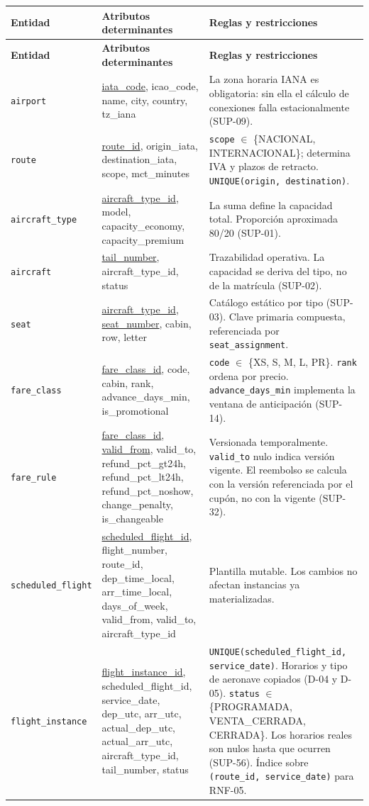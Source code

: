 \documentclass[10pt,letterpaper]{article}
\begin{document}
\begin{longtable}{@{}L{3.0cm} L{6.6cm} L{6.2cm}@{}}
\toprule \textbf{Entidad} & \textbf{Atributos determinantes} & \textbf{Reglas y restricciones} \\ \midrule \endfirsthead
\toprule \textbf{Entidad} & \textbf{Atributos determinantes} & \textbf{Reglas y restricciones} \\ \midrule \endhead
\texttt{airport} & \underline{iata\_code}, icao\_code, name, city, country, tz\_iana & La zona horaria IANA es obligatoria: sin ella el cálculo de conexiones falla estacionalmente (SUP-09). \\
\texttt{route} & \underline{route\_id}, origin\_iata, destination\_iata, scope, mct\_minutes & \texttt{scope} $\in$ \{NACIONAL, INTERNACIONAL\}; determina IVA y plazos de retracto. \texttt{UNIQUE(origin, destination)}. \\
\texttt{aircraft\_type} & \underline{aircraft\_type\_id}, model, capacity\_economy, capacity\_premium & La suma define la capacidad total. Proporción aproximada 80/20 (SUP-01). \\
\texttt{aircraft} & \underline{tail\_number}, aircraft\_type\_id, status & Trazabilidad operativa. La capacidad se deriva del tipo, no de la matrícula (SUP-02). \\
\texttt{seat} & \underline{aircraft\_type\_id}, \underline{seat\_number}, cabin, row, letter & Catálogo estático por tipo (SUP-03). Clave primaria compuesta, referenciada por \texttt{seat\_assignment}. \\
\texttt{fare\_class} & \underline{fare\_class\_id}, code, cabin, rank, advance\_days\_min, is\_promotional & \texttt{code} $\in$ \{XS, S, M, L, PR\}. \texttt{rank} ordena por precio. \texttt{advance\_days\_min} implementa la ventana de anticipación (SUP-14). \\
\texttt{fare\_rule} & \underline{fare\_class\_id}, \underline{valid\_from}, valid\_to, refund\_pct\_gt24h, refund\_pct\_lt24h, refund\_pct\_noshow, change\_penalty, is\_changeable & Versionada temporalmente. \texttt{valid\_to} nulo indica versión vigente. El reembolso se calcula con la versión referenciada por el cupón, no con la vigente (SUP-32). \\
\texttt{scheduled\_flight} & \underline{scheduled\_flight\_id}, flight\_number, route\_id, dep\_time\_local, arr\_time\_local, days\_of\_week, valid\_from, valid\_to, aircraft\_type\_id & Plantilla mutable. Los cambios no afectan instancias ya materializadas. \\
\texttt{flight\_instance} & \underline{flight\_instance\_id}, scheduled\_flight\_id, service\_date, dep\_utc, arr\_utc, actual\_dep\_utc, actual\_arr\_utc, aircraft\_type\_id, tail\_number, status & \texttt{UNIQUE(scheduled\_flight\_id, service\_date)}. Horarios y tipo de aeronave copiados (D-04 y D-05). \texttt{status} $\in$ \{PROGRAMADA, VENTA\_CERRADA, CERRADA\}. Los horarios reales son nulos hasta que ocurren (SUP-56). Índice sobre \texttt{(route\_id, service\_date)} para RNF-05. \\

\end{longtable}
\end{document}
